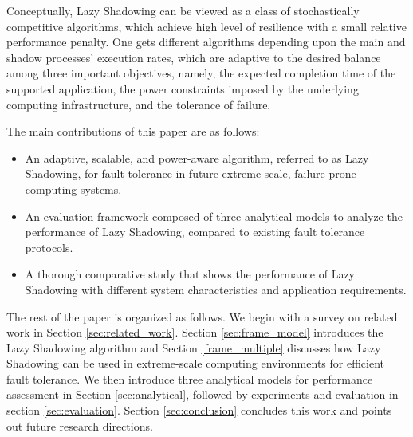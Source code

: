 Conceptually, Lazy Shadowing can be viewed as a class of stochastically competitive algorithms, which 
achieve high level of resilience with a small relative performance penalty.
One gets different algorithms depending upon the main and shadow processes' execution rates, which are adaptive to the desired balance among three important objectives, namely, the expected completion time of the supported application, the power constraints imposed by the underlying computing infrastructure, and the tolerance of failure. %

The main contributions of this paper are as follows:
\begin{itemize}
	\item An adaptive, scalable, and power-aware algorithm, referred to as Lazy Shadowing, for fault tolerance in future extreme-scale, failure-prone computing systems.
	\item An evaluation framework composed of three analytical models to analyze the performance of Lazy Shadowing, compared to existing fault tolerance protocols.
	\item A thorough comparative study that shows the performance of Lazy Shadowing with different system characteristics and application requirements.
\end{itemize}


The rest of the paper is organized as follows. We begin with a survey on related work in Section 
\ref{sec:related_work}. Section \ref{sec:frame_model} introduces the Lazy Shadowing algorithm and Section \ref{frame_multiple} discusses how Lazy Shadowing can be used in 
extreme-scale computing environments for efficient fault tolerance. 
We then introduce three analytical models for performance assessment
in Section \ref{sec:analytical}, 
followed by experiments and evaluation in
section \ref{sec:evaluation}. Section \ref{sec:conclusion} concludes this work and points out 
future research directions.